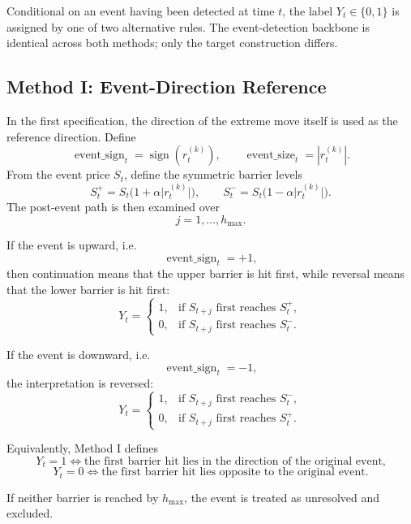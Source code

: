 \documentclass[11pt,a4paper]{article}
\begin{document}
	Conditional on an event having been detected at time \(t\), the label \(Y_t \in \{0,1\}\) is assigned by one of two alternative rules. The event-detection backbone is identical across both methods; only the target construction differs.
	
	
	\subsection{Method I: Event-Direction Reference}
	
	In the first specification, the direction of the extreme move itself is used as the reference direction. Define
	\[
	\operatorname{event\_sign}_t = \operatorname{sign}\!\left(r_t^{(k)}\right),
	\qquad
	\operatorname{event\_size}_t = \left|r_t^{(k)}\right|.
	\]
	From the event price \(S_t\), define the symmetric barrier levels
	\[
	S_t^{+} = S_t\bigl(1+\alpha \lvert r_t^{(k)}\rvert\bigr),
	\qquad
	S_t^{-} = S_t\bigl(1-\alpha \lvert r_t^{(k)}\rvert\bigr).
	\]
	The post-event path is then examined over
	\[
	j=1,\dots,h_{\max}.
	\]
	
	If the event is upward, i.e.
	\[
	\operatorname{event\_sign}_t=+1,
	\]
	then continuation means that the upper barrier is hit first, while reversal means that the lower barrier is hit first:
	\[
	Y_t =
	\begin{cases}
		1, & \text{if } S_{t+j} \text{ first reaches } S_t^{+},\\[1mm]
		0, & \text{if } S_{t+j} \text{ first reaches } S_t^{-}.
	\end{cases}
	\]
	
	If the event is downward, i.e.
	\[
	\operatorname{event\_sign}_t=-1,
	\]
	the interpretation is reversed:
	\[
	Y_t =
	\begin{cases}
		1, & \text{if } S_{t+j} \text{ first reaches } S_t^{-},\\[1mm]
		0, & \text{if } S_{t+j} \text{ first reaches } S_t^{+}.
	\end{cases}
	\]
	
	Equivalently, Method I defines
	\[
	Y_t=1 \iff \text{the first barrier hit lies in the direction of the original event,}
	\]
	\[
	Y_t=0 \iff \text{the first barrier hit lies opposite to the original event.}
	\]
	
	If neither barrier is reached by \(h_{\max}\), the event is treated as unresolved and excluded.
	
\end{document}
